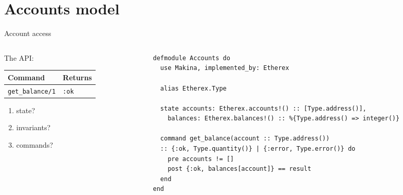 \documentclass[aspectratio=169, 10pt]{beamer}
\begin{document}
\section{Accounts model}
\label{sec:org509de40}

\begin{frame}[label={sec:org37f0338},fragile]{Account access}
 \begin{columns}
\begin{column}{0.28\columnwidth}
The API:

\begin{center}
\begin{tabular}{ll}
Command & Returns\\
\hline
\texttt{get\_balance/1} & \texttt{:ok}\\
\end{tabular}
\end{center}

\vspace{0.5cm}

\begin{enumerate}
\item state?
\item invariants?
\item commands?
\end{enumerate}
\end{column}

\begin{column}{0.68\columnwidth}
\lstset{language=elixir,label= ,caption= ,captionpos=b,numbers=none,style=display}
\begin{lstlisting}
defmodule Accounts do
  use Makina, implemented_by: Etherex

  alias Etherex.Type

  state accounts: Etherex.accounts!() :: [Type.address()],
    balances: Etherex.balances!() :: %{Type.address() => integer()}

  command get_balance(account :: Type.address())
  :: {:ok, Type.quantity()} | {:error, Type.error()} do
    pre accounts != []
    post {:ok, balances[account]} == result
  end
end
\end{lstlisting}
\end{column}
\end{columns}
\end{frame}
\end{document}
